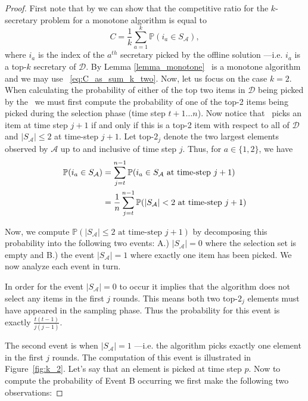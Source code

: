 \begin{proof}
First note that by \citet[Lemma 3.3]{albers2020new} we can show that the competitive ratio for the $k$-secretary problem for a monotone algorithm is equal to 
\begin{equation}
\label{eq:C_as_sum_k_two}
    C = \frac{1}{k}\sum_{a=1}^k \mathbb{P}(i_a \in S_\mathcal{A}), %
\end{equation}
where $i_a$ is the index of the $a^{th}$ secretary picked by the offline solution ---i.e. $i_a$ is a top-$k$ secretary of $\mathcal{D}$. By Lemma \ref{lemma_monotone} \algoname \ is a monotone algorithm and we may use ~\eqref{eq:C_as_sum_k_two}.
Now, let us focus on the case $k=2$.
When calculating the probability of either of the top two items in $\mathcal{D}$ being picked by the \algoname\ we must first compute the probability of one of the top-2 items being picked during the selection phase (time step $t+1 \dots n$). Now notice that \algoname\ picks an item at time step $j+1$ if and only if this is a top-2 item with respect to all of $\mathcal{D}$ and $|S_{\mathcal{A}}| \leq 2$ at time-step $j+1$. Let top-$2_j$ denote the two largest elements observed by $\mathcal{A}$ up to and inclusive of time step $j$. Thus, for $a \in \{1,2\}$, we have
\begin{align}
    \mathbb{P}(i_a \in S_\mathcal{A}) 
    &= \sum_{j=t}^{n-1} \mathbb{P}(i_a \in S_\mathcal{A} \text{ at time-step }j+1)\\ %
    &= \frac{1}{n}\sum_{j=t}^{n-1} \mathbb{P}(|S_{\mathcal{A}}| < 2 \text{ at time-step } j + 1) \notag
\end{align}

Now, we compute $\mathbb{P}(|S_{\mathcal{A}}| \leq 2 \text{ at time-step } j+1)$ by decomposing this probability into the following two events: A.) $|S_{\mathcal{A}}| = 0$ where the selection set is empty and B.) the event $|S_{\mathcal{A}}| = 1$ where exactly one item has been picked. We now analyze each event in turn.

 In order for the event $|S_{\mathcal{A}}|=0$ to occur it implies that the algorithm does not select any items in the first $j$ rounds. This means both two top-$2_j$ elements must have appeared in the sampling phase. Thus the probability for this event is exactly $\frac{t(t - 1)}{j (j - 1)}$. 

The second event is when $|S_{\mathcal{A}}|=1$ ---i.e. the algorithm picks exactly one element in the first $j$ rounds. The computation of this event is illustrated in Figure~\ref{fig:k_2}. Let's say that an element is picked at time step $p$. Now to compute the probability of Event B occurring we first make the following two observations:


\end{proof}

